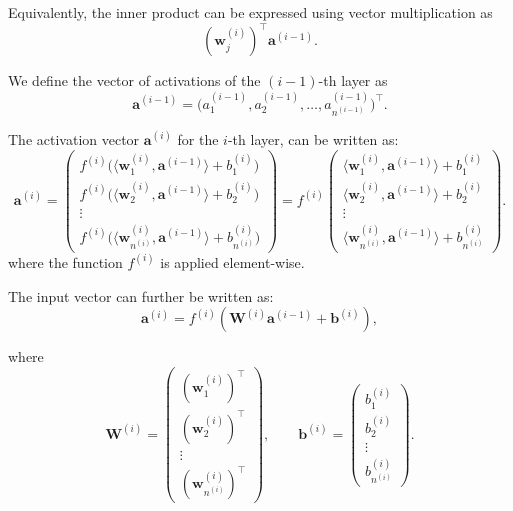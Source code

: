 Equivalently, the inner product can be expressed using vector multiplication as
\[
(\mathbf{w}^{(i)}_j)^\top \mathbf{a}^{(i-1)}.
\]

We define the vector of activations of the $(i-1)$-th layer as
\[
\mathbf{a}^{(i-1)} = \big(a^{(i-1)}_1, a^{(i-1)}_2, \dots, a^{(i-1)}_{n^{(i-1)}}\big)^{\top}.
\]


The activation vector $\mathbf{a}^{(i)}$ for the $i$-th layer, can be written as:
\begin{equation*}
\mathbf{a}^{(i)} =
\begin{pmatrix}
f^{(i)}\!\big( \langle \mathbf{w}^{(i)}_1, \mathbf{a}^{(i-1)} \rangle + b^{(i)}_1 \big) \\
f^{(i)}\!\big( \langle \mathbf{w}^{(i)}_2, \mathbf{a}^{(i-1)} \rangle + b^{(i)}_2 \big) \\
\vdots \\
f^{(i)}\!\big( \langle \mathbf{w}^{(i)}_{n^{(i)}}, \mathbf{a}^{(i-1)} \rangle + b^{(i)}_{n^{(i)}} \big)
\end{pmatrix}
=
f^{(i)}\!\left(
\begin{array}{c}
\langle \mathbf{w}^{(i)}_1, \mathbf{a}^{(i-1)} \rangle + b^{(i)}_1 \\
\langle \mathbf{w}^{(i)}_2, \mathbf{a}^{(i-1)} \rangle + b^{(i)}_2 \\
\vdots \\
\langle \mathbf{w}^{(i)}_{n^{(i)}}, \mathbf{a}^{(i-1)} \rangle + b^{(i)}_{n^{(i)}}
\end{array}
\right).
\end{equation*}
where the function $f^{(i)}$ is applied element-wise.

The input vector can further be written as:
\begin{equation*}
\mathbf{a}^{(i)} = f^{(i)}\!\left(\mathbf{W}^{(i)} \mathbf{a}^{(i-1)} + \mathbf{b}^{(i)} \right),
\end{equation*}

where
\begin{equation*}
\mathbf{W}^{(i)} =
\begin{pmatrix}
(\mathbf{w}^{(i)}_1)^\top \\
(\mathbf{w}^{(i)}_2)^\top \\
\vdots \\
(\mathbf{w}^{(i)}_{n^{(i)}})^\top
\end{pmatrix},
\qquad
\mathbf{b}^{(i)} =
\begin{pmatrix}
b^{(i)}_1 \\
b^{(i)}_2 \\
\vdots \\
b^{(i)}_{n^{(i)}}
\end{pmatrix}.
\end{equation*}

